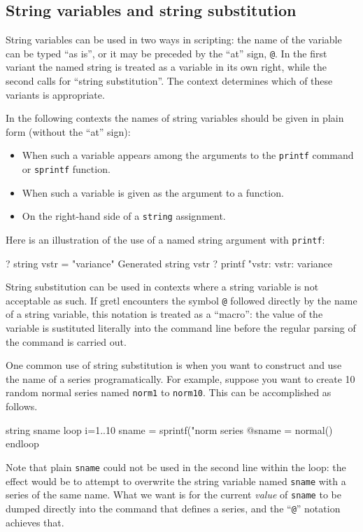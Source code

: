 \subsection{String variables and string substitution}

String variables can be used in two ways in scripting: the name of the
variable can be typed ``as is'', or it may be preceded by the ``at''
sign, \verb|@|. In the first variant the named string is treated as a
variable in its own right, while the second calls for ``string
substitution''. The context determines which of these variants is
appropriate. 

In the following contexts the names of string variables should be
given in plain form (without the ``at'' sign):

\begin{itemize}
\item When such a variable appears among the arguments to the
  \texttt{printf} command or \texttt{sprintf} function.
\item When such a variable is given as the argument to a function.
\item On the right-hand side of a \texttt{string} assignment.
\end{itemize}

Here is an illustration of the use of a named string argument with
\texttt{printf}:
%
\begin{code}
? string vstr = "variance"
Generated string vstr
? printf "vstr: %
vstr:     variance
\end{code}

String substitution can be used in contexts where a string variable is
not acceptable as such. If gretl encounters the symbol \verb|@|
followed directly by the name of a string variable, this notation is
treated as a ``macro'': the value of the variable is sustituted
literally into the command line before the regular parsing of the
command is carried out.

One common use of string substitution is when you want to construct
and use the name of a series programatically. For example, suppose you
want to create 10 random normal series named \texttt{norm1} to
\texttt{norm10}. This can be accomplished as follows.
%
\begin{code}
string sname
loop i=1..10
  sname = sprintf("norm%
  series @sname = normal()
endloop
\end{code}
%
Note that plain \texttt{sname} could not be used in the second line
within the loop: the effect would be to attempt to overwrite the
string variable named \texttt{sname} with a series of the same
name. What we want is for the current \textit{value} of
\texttt{sname} to be dumped directly into the command that defines a
series, and the ``\verb|@|'' notation achieves that.

